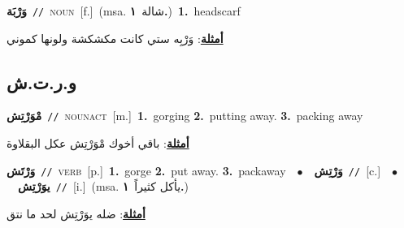 \documentclass[10pt,a4paper,twoside]{article} %
\begin{document}
\begin{multicols}{2}
{\setlength\topsep{0pt}\textbf{\foreignlanguage{arabic}{وَرْبَة}}\ {\color{gray}\texttt{//}\color{black}}\ \textsc{noun}\ [f.]\ \color{gray}(msa. \foreignlanguage{arabic}{شالة}~\foreignlanguage{arabic}{\textbf{١.}})\color{black}\ \textbf{1.}~headscarf\  \begin{flushright}\color{gray}\foreignlanguage{arabic}{\textbf{\underline{\foreignlanguage{arabic}{أمثلة}}}: وَرْبِه ستي كانت مكشكشة ولونها كموني}\end{flushright}\color{black}} \vspace{2mm}

\vspace{-3mm}
\subsection*{\color{blue}\foreignlanguage{arabic}{و.ر.ت.ش}\color{blue}{}} 

{\setlength\topsep{0pt}\textbf{\foreignlanguage{arabic}{مْوَرْتِش}}\ {\color{gray}\texttt{//}\color{black}}\ \textsc{noun\textunderscore act}\ [m.]\ \textbf{1.}~gorging  \textbf{2.}~putting away.  \textbf{3.}~packing away\  \begin{flushright}\color{gray}\foreignlanguage{arabic}{\textbf{\underline{\foreignlanguage{arabic}{أمثلة}}}: باقي أخوك مْوَرْتِش عكل البقلاوة}\end{flushright}\color{black}} \vspace{2mm}

{\setlength\topsep{0pt}\textbf{\foreignlanguage{arabic}{وَرْتَش}}\ {\color{gray}\texttt{//}\color{black}}\ \textsc{verb}\ [p.]\ \textbf{1.}~gorge  \textbf{2.}~put away.  \textbf{3.}~packaway\ \ $\bullet$\ \ \setlength\topsep{0pt}\textbf{\foreignlanguage{arabic}{وَرْتِش}}\ {\color{gray}\texttt{//}\color{black}}\ [c.]\ \ $\bullet$\ \ \setlength\topsep{0pt}\textbf{\foreignlanguage{arabic}{يوَرْتِش}}\ {\color{gray}\texttt{//}\color{black}}\ [i.]\ \color{gray}(msa. \foreignlanguage{arabic}{يأكل كثيراً}~\foreignlanguage{arabic}{\textbf{١.}})\color{black}\  \begin{flushright}\color{gray}\foreignlanguage{arabic}{\textbf{\underline{\foreignlanguage{arabic}{أمثلة}}}: ضله يوَرْتِش لحد ما نتق}\end{flushright}\color{black}} \vspace{2mm}


\end{multicols}
\end{document}
